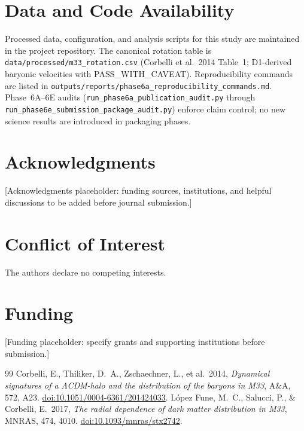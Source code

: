 \documentclass[11pt,a4paper]{article}
\begin{document}
\section*{Data and Code Availability}
\label{sec:availability}

Processed data, configuration, and analysis scripts for this study are maintained in the project repository.
The canonical rotation table is \texttt{data/processed/m33\_rotation.csv} (Corbelli et al.\ 2014 Table~1; D1-derived baryonic velocities with PASS\_WITH\_CAVEAT).
Reproducibility commands are listed in \texttt{outputs/reports/phase6a\_reproducibility\_commands.md}.
Phase~6A--6E audits (\texttt{run\_phase6a\_publication\_audit.py} through \texttt{run\_phase6e\_submission\_package\_audit.py}) enforce claim control; no new science results are introduced in packaging phases.

\section*{Acknowledgments}
\label{sec:acknowledgments}

[Acknowledgments placeholder: funding sources, institutions, and helpful discussions to be added before journal submission.]

\section*{Conflict of Interest}
\label{sec:coi}

The authors declare no competing interests.

\section*{Funding}
\label{sec:funding}

[Funding placeholder: specify grants and supporting institutions before submission.]


\begin{thebibliography}{99}
Corbelli, E., Thiliker, D.~A., Zschaechner, L., et al.\ 2014,
\textit{Dynamical signatures of a $\Lambda$CDM-halo and the distribution of the baryons in M33},
A\&A, 572, A23.
\href{https://doi.org/10.1051/0004-6361/201424033}{doi:10.1051/0004-6361/201424033}.
L\'opez Fune, M.~C., Salucci, P., \& Corbelli, E.\ 2017,
\textit{The radial dependence of dark matter distribution in M33},
MNRAS, 474, 4010.
\href{https://doi.org/10.1093/mnras/stx2742}{doi:10.1093/mnras/stx2742}.
\end{thebibliography}
\end{document}
